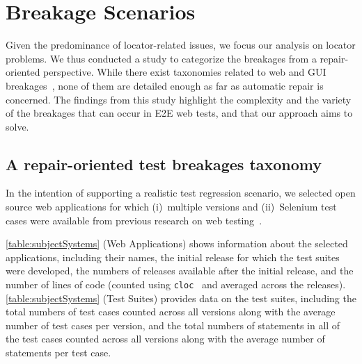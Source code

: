 
\section{Breakage Scenarios}\label{sec:study}

Given the predominance of locator-related issues, we focus our analysis on locator problems. We thus conducted a study to categorize the breakages from a repair-oriented perspective. 
While there exist taxonomies related to web and GUI breakages~\cite{Hammoudi-2016-ICST,Issa:2012:VTG:2412102.2412107,7102582}, none of them are detailed enough as far as automatic repair is concerned. 
The findings from this study highlight the complexity and the variety of the breakages that can occur in E2E web tests, and that our approach aims to solve.

\subsection{A repair-oriented test breakages taxonomy}\label{sec:taxonomy}

\label{sec:study}
In the intention of supporting a realistic test regression scenario, we selected open source web applications for which (i)~multiple versions and (ii)~Selenium test cases were available from previous research on web testing~\cite{WCRE}. %

\autoref{table:subjectSystems} (Web Applications) shows information about the selected applications, including their names, the initial release for which the test suites were developed, the numbers of releases available after the initial release, and the number of lines of code (counted using \texttt{cloc}~\cite{cloc} and averaged across the releases).
\autoref{table:subjectSystems} (Test Suites) provides data on the test suites, including the total numbers of test cases counted across all versions along with the average number of test cases per version, and the total numbers of statements in all of the test cases counted across all versions along with the average number of statements per test case.

